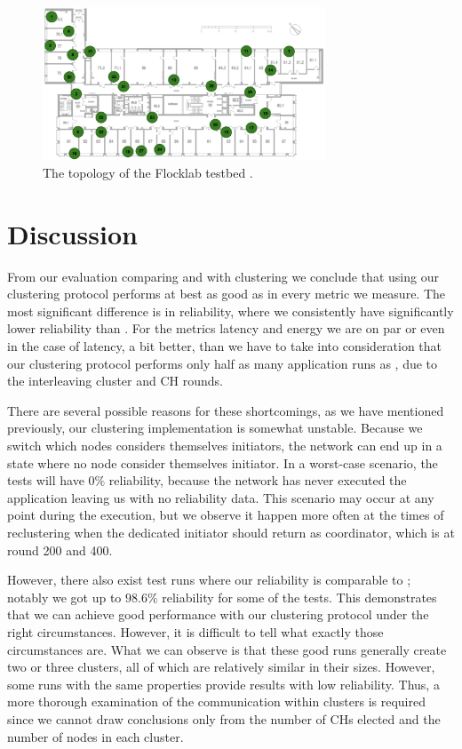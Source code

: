\begin{figure}[bt]
    \centering
    \includegraphics[width=0.75\textwidth]{figure/Results/ChaosComparison/Flocklab/FlocklabTopology.png}
    \caption{The topology of the Flocklab testbed \cite{Lim2013-flocklab-introduction}.}
    \label{fig:flocklab-topology}
\end{figure}



\section{Discussion}
From our evaluation comparing \atwo{} and \atwo{} with clustering we conclude that using our clustering protocol performs at best as good as \atwo{} in every metric we measure. The most significant difference is in reliability, where we consistently have significantly lower reliability than \atwo{}. For the metrics latency and energy we are on par or even in the case of latency, a bit better, than \atwo{} we have to take into consideration that our clustering protocol performs only half as many application runs as \atwo{}, due to the interleaving cluster and CH rounds.

There are several possible reasons for these shortcomings, as we have mentioned previously, our clustering implementation is somewhat unstable. Because we switch which nodes considers themselves initiators, the network can end up in a state where no node consider themselves initiator. In a worst-case scenario, the tests will have $0\%$ reliability, because the network has never executed the application leaving us with no reliability data. This scenario may occur at any point during the execution, but we observe it happen more often at the times of reclustering when the dedicated initiator should return as coordinator, which is at round 200 and 400.

However, there also exist test runs where our reliability is comparable to \atwo{}; notably we got up to $98.6\%$ reliability for some of the tests. This demonstrates that we can achieve good performance with our clustering protocol under the right circumstances. However, it is difficult to tell what exactly those circumstances are. What we can observe is that these good runs generally create two or three clusters, all of which are relatively similar in their sizes. However, some runs with the same properties provide results with low reliability. Thus, a more thorough examination of the communication within clusters is required since we cannot draw conclusions only from the number of CHs elected and the number of nodes in each cluster.

